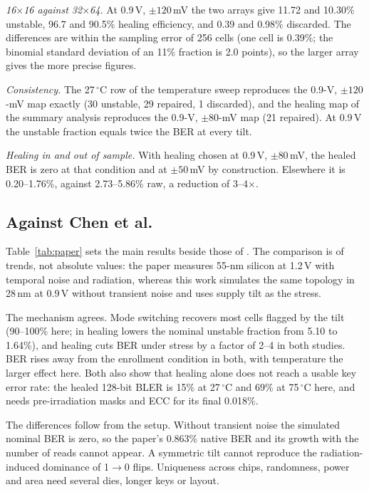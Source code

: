 \documentclass[journal]{IEEEtran}
\begin{document}
\emph{16$\times$16 against 32$\times$64.} At 0.9\,V, $\pm120$\,mV the two arrays give 11.72 and 10.30\% unstable, 96.7 and 90.5\% healing efficiency, and 0.39 and 0.98\% discarded. The differences are within the sampling error of 256 cells (one cell is 0.39\%; the binomial standard deviation of an 11\% fraction is 2.0 points), so the larger array gives the more precise figures.

\emph{Consistency.} The 27\,$^\circ$C row of the temperature sweep reproduces the 0.9-V, $\pm120$-mV map exactly (30 unstable, 29 repaired, 1 discarded), and the healing map of the summary analysis reproduces the 0.9-V, $\pm80$-mV map (21 repaired). At 0.9\,V the unstable fraction equals twice the BER at every tilt.

\emph{Healing in and out of sample.} With healing chosen at 0.9\,V, $\pm80$\,mV, the healed BER is zero at that condition and at $\pm50$\,mV by construction. Elsewhere it is 0.20--1.76\%, against 2.73--5.86\% raw, a reduction of 3--4$\times$.

\subsection{Against Chen et al.}
Table~\ref{tab:paper} sets the main results beside those of \cite{chen2024}. The comparison is of trends, not absolute values: the paper measures 55-nm silicon at 1.2\,V with temporal noise and radiation, whereas this work simulates the same topology in 28\,nm at 0.9\,V without transient noise and uses supply tilt as the stress.

The mechanism agrees. Mode switching recovers most cells flagged by the tilt (90--100\% here; in \cite{chen2024} healing lowers the nominal unstable fraction from 5.10 to 1.64\%), and healing cuts BER under stress by a factor of 2--4 in both studies. BER rises away from the enrollment condition in both, with temperature the larger effect here. Both also show that healing alone does not reach a usable key error rate: the healed 128-bit BLER is 15\% at 27\,$^\circ$C and 69\% at 75\,$^\circ$C here, and \cite{chen2024} needs pre-irradiation masks and ECC for its final 0.018\%.

The differences follow from the setup. Without transient noise the simulated nominal BER is zero, so the paper's 0.863\% native BER and its growth with the number of reads cannot appear. A symmetric tilt cannot reproduce the radiation-induced dominance of 1$\rightarrow$0 flips. Uniqueness across chips, randomness, power and area need several dies, longer keys or layout.
\end{document}

